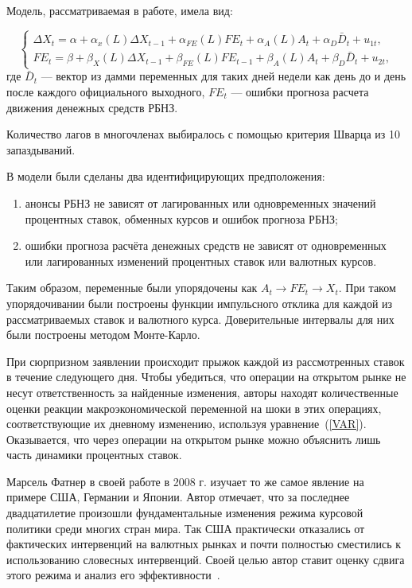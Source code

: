 \documentclass[14pt,a4paper, oneside]{extreport}
\begin{document}
Модель, рассматриваемая в работе, имела вид: 

\begin{equation}\label{VAR}
\left\{
\begin{aligned}
\Delta X_t = \alpha + \alpha_x (L) \Delta X_{t-1} + \alpha_{FE}(L) FE_t + \alpha_A(L) A_t + \alpha_D \bar D_t + u_{1t}, \\
FE_t = \beta + \beta_X(L) \Delta X_{t-1} + \beta_{FE}(L) FE_{t-1} + \beta_A(L) A_t + \beta_D \bar D_t + u_{2t},
\end{aligned} \right.
\end{equation} где $\bar D_t$ --- вектор из дамми переменных для таких дней недели как день до и день после каждого официального выходного, $FE_t$ --- ошибки прогноза расчета движения денежных средств РБНЗ.

Количество лагов в многочленах выбиралось с помощью критерия Шварца из 10 запаздываний.

В модели были сделаны два идентифицирующих предположения:

\begin{enumerate}

\item анонсы РБНЗ не зависят от лагированных или одновременных значений процентных ставок, обменных курсов и ошибок прогноза РБНЗ;

\item ошибки прогноза расчёта денежных средств не зависят от одновременных или лагированных изменений процентных ставок или валютных курсов. 
\end{enumerate}

Таким образом, переменные были упорядочены как $A_t \to  FE_t \to X_t$. При таком упорядочивании были построены функции импульсного отклика для каждой из рассматриваемых ставок и валютного курса. Доверительные интервалы для них были построены методом Монте-Карло.

При сюрпризном заявлении происходит прыжок каждой из рассмотренных ставок в течение следующего дня. Чтобы убедиться, что операции на открытом рынке не несут ответственность за найденные изменения, авторы находят количественные оценки реакции макроэкономической переменной на шоки в этих операциях, соответствующие их дневному изменению, используя уравнение~(\ref{VAR}). 
Оказывается, что через операции на открытом рынке можно объяснить лишь часть динамики процентных ставок. 


Марсель Фатнер в своей работе в 2008 г. изучает то же самое явление на примере США, Германии и Японии. Автор отмечает, что за последнее двадцатилетие произошли фундаментальные изменения режима курсовой политики среди многих стран мира. Так США практически отказались от фактических интервенций на валютных рынках и почти полностью сместились к использованию словесных интервенций. Своей целью автор ставит оценку сдвига этого режима и анализ его эффективности~\cite{fratzscher2008communication}. 
\end{document}
